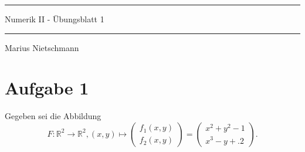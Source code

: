 \documentclass[11pt]{article}
\theoremstyle{plain}
\theoremstyle{definition}
\theoremstyle{remark}
\newcommand{\R}{\mathbb{R}}
\begin{document}
\pagestyle{fancy}
\thispagestyle{plain}

\rule{\textwidth}{.5pt}
\begin{center}
\Huge{Numerik II - Übungsblatt 1}
\end{center}

\rule{\textwidth}{.5pt}
\text{} \hfill Marius Nietschmann 



\section*{Aufgabe 1}

Gegeben sei die Abbildung 
\[ F : \R^2 \to \R^2, (x,y) \longmapsto 
\begin{pmatrix}
	f_1 (x,y) \\ 
	f_2 (x,y) 
\end{pmatrix} =
\begin{pmatrix}
	x^2 + y^2 - 1 \\ 
	x^3 - y + .2
\end{pmatrix}. \] 
\end{document}
